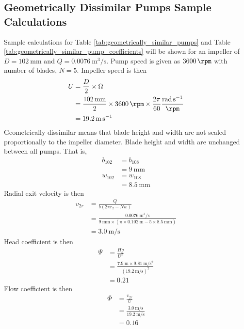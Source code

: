 \subsection{Geometrically Dissimilar Pumps Sample Calculations}
Sample calculations for Table \ref{tab:geometrically_similar_pumps} and Table \ref{tab:geometrically_similar_pump_coefficients} will be shown for an impeller of $D = \qty{102}{\milli\meter}$ and $Q = \qty{0.0076}{\meter\cubed\per\second}$. Pump speed is given as $\qty{3600}{\rpm}$ with number of blades, $N = 5$. Impeller speed is then
\begin{align*}
    U &= \frac{D}{2} \times \Omega \\
    &= \frac{\qty{102}{\milli\meter}}{2} \times \qty{3600}{\rpm} \times \frac{2\pi}{60} \frac{\unit{\radian\per\second}}{\unit{\rpm}} \\
    &= \qty{19.2}{\meter\per\second}
\end{align*}
Geometrically dissimilar means that blade height and width are not scaled proportionally to the impeller diameter. Blade height and width are unchanged between all pumps. That is,
\begin{align*}
    b_{102} &= b_{108}  \\
    &= \qty{9}{\milli\meter} \\
    w_{102} &= w_{108}  \\
    &= \qty{8.5}{\milli\meter}
\end{align*}
Radial exit velocity is then
\begin{align*}
    v_{2r} &= \frac{Q}{b(2\pi r_2 - Nw)} \\
    &= \frac{\qty{0.0076}{\meter\cubed\per\second}}{\qty{9}{\milli\meter} \times (\pi \times \qty{0.102}{\meter} - 5 \times \qty{8.5}{\milli\meter})} \\
    &= \qty{3.0}{\meter\per\second}
\end{align*}
Head coefficient is then
\begin{align*}
    \Psi &= \frac{Hg}{U^2} \\
    &= \frac{\qty{7.9}{\meter} \times \qty{9.81}{\meter\per\second\squared}}{(\qty{19.2}{\meter\per\second})^2} \\
    &= 0.21
\end{align*}
Flow coefficient is then
\begin{align*}
    \Phi &= \frac{v_{2r}}{U} \\
    &= \frac{\qty{3.0}{\meter\per\second}}{\qty{19.2}{\meter\per\second}} \\
    &= 0.16
\end{align*}